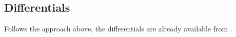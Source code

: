 \documentclass[english]{../thermomemo/thermomemo}
\newcommand{\excess}{\text{E}}
\begin{document}
\subsection{Differentials}
Follows the approach above, the differentials are already available
from \cite{Wilhelmsen2013}.
\clearpage


\end{document}
